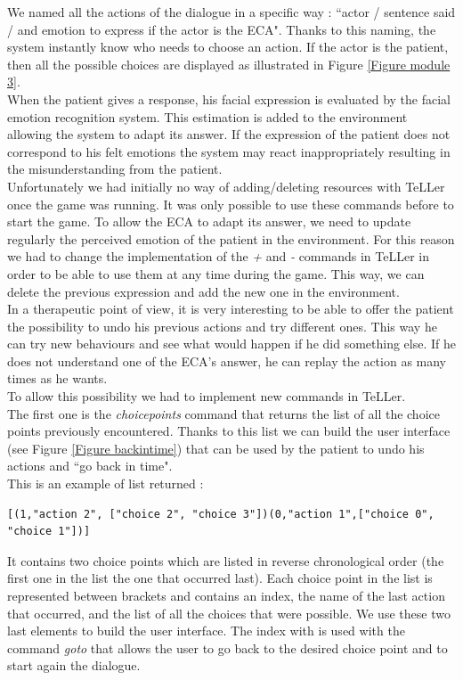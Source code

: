 \documentclass[11pt]{article}
\begin{document}
We named all the actions of the dialogue in a specific way : ``actor / sentence said / and emotion to express if the actor is the ECA". Thanks to this naming, the system instantly know who needs to choose an action. If the actor is the patient, then all the possible choices are displayed as illustrated in Figure \ref{Figure module 3}.\\

When the patient gives a response, his facial expression is evaluated by the facial emotion recognition system. This estimation is added to the environment allowing the system to adapt its answer. If the expression of the patient does not correspond to his felt emotions the system may react inappropriately resulting in the misunderstanding from the patient.\\

Unfortunately we had initially no way of adding/deleting resources with TeLLer once the game was running. It was only possible to use these commands before to start the game. To allow the ECA to adapt its answer, we need to update regularly the perceived emotion of the patient in the environment. For this reason we had to change the implementation of the \textit{+} and \textit{-} commands in TeLLer in order to be able to use them at any time during the game. This way, we can delete the previous expression and add the new one in the environment.\\

In a therapeutic point of view, it is very interesting to be able to offer the patient the possibility to undo his previous actions and try different ones. This way he can try new behaviours and see what would happen if he did something else. If he does not understand one of the ECA's answer, he can replay the action as many times as he wants.\\

To allow this possibility we had to implement new commands in TeLLer.\\
The first one is the \textit{choicepoints} command that returns the list of all the choice points previously encountered. Thanks to this list we can build the user interface (see Figure \ref{Figure backintime}) that can be used by the patient to undo his actions and ``go back in time".\\
This is an example of list returned :
\begin{lstlisting}[basicstyle=\small]
[(1,"action 2", ["choice 2", "choice 3"])(0,"action 1",["choice 0", "choice 1"])]
\end{lstlisting}
It contains two choice points which are listed in reverse chronological order (the first one in the list the one that occurred last). Each choice point in the list is represented between brackets and contains an index, the name of the last action that occurred, and the list of all the choices that were possible. We use these two last elements to build the user interface. The index with is used with the command \textit{goto} that allows the user to go back to the desired choice point and to start again the dialogue. \\
\end{document}
